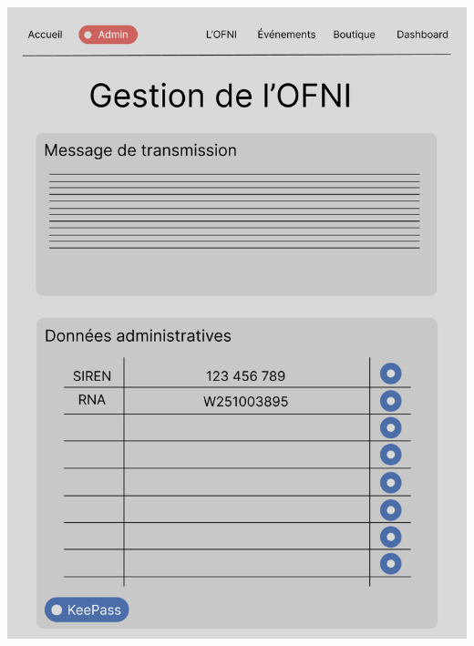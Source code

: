 \begin{frame}
\begin{minipage}{0.48\textwidth}
        \includegraphics[width=\linewidth]{pictures/figma.png}
    \end{minipage}
\end{frame}
